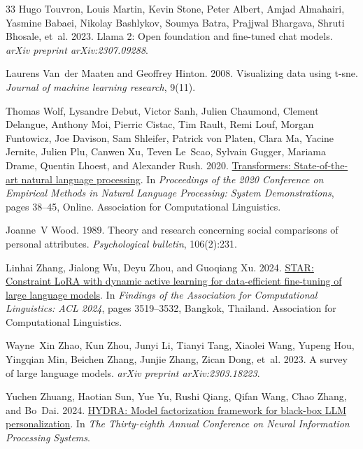 \documentclass[11pt]{article}
\begin{document}
\begin{thebibliography}{33}
Hugo Touvron, Louis Martin, Kevin Stone, Peter Albert, Amjad Almahairi, Yasmine Babaei, Nikolay Bashlykov, Soumya Batra, Prajjwal Bhargava, Shruti Bhosale, et~al. 2023.
\newblock Llama 2: Open foundation and fine-tuned chat models.
\newblock \emph{arXiv preprint arXiv:2307.09288}.

Laurens Van~der Maaten and Geoffrey Hinton. 2008.
\newblock Visualizing data using t-sne.
\newblock \emph{Journal of machine learning research}, 9(11).

Thomas Wolf, Lysandre Debut, Victor Sanh, Julien Chaumond, Clement Delangue, Anthony Moi, Pierric Cistac, Tim Rault, Remi Louf, Morgan Funtowicz, Joe Davison, Sam Shleifer, Patrick von Platen, Clara Ma, Yacine Jernite, Julien Plu, Canwen Xu, Teven Le~Scao, Sylvain Gugger, Mariama Drame, Quentin Lhoest, and Alexander Rush. 2020.
\newblock \href {https://doi.org/10.18653/v1/2020.emnlp-demos.6} {Transformers: State-of-the-art natural language processing}.
\newblock In \emph{Proceedings of the 2020 Conference on Empirical Methods in Natural Language Processing: System Demonstrations}, pages 38--45, Online. Association for Computational Linguistics.

Joanne~V Wood. 1989.
\newblock Theory and research concerning social comparisons of personal attributes.
\newblock \emph{Psychological bulletin}, 106(2):231.

Linhai Zhang, Jialong Wu, Deyu Zhou, and Guoqiang Xu. 2024.
\newblock \href {https://doi.org/10.18653/v1/2024.findings-acl.209} {{STAR}: Constraint {L}o{RA} with dynamic active learning for data-efficient fine-tuning of large language models}.
\newblock In \emph{Findings of the Association for Computational Linguistics: ACL 2024}, pages 3519--3532, Bangkok, Thailand. Association for Computational Linguistics.

Wayne~Xin Zhao, Kun Zhou, Junyi Li, Tianyi Tang, Xiaolei Wang, Yupeng Hou, Yingqian Min, Beichen Zhang, Junjie Zhang, Zican Dong, et~al. 2023.
\newblock A survey of large language models.
\newblock \emph{arXiv preprint arXiv:2303.18223}.

Yuchen Zhuang, Haotian Sun, Yue Yu, Rushi Qiang, Qifan Wang, Chao Zhang, and Bo~Dai. 2024.
\newblock \href {https://openreview.net/forum?id=CKgNgKmHYp} {{HYDRA}: Model factorization framework for black-box {LLM} personalization}.
\newblock In \emph{The Thirty-eighth Annual Conference on Neural Information Processing Systems}.

\end{thebibliography}
\end{document}
